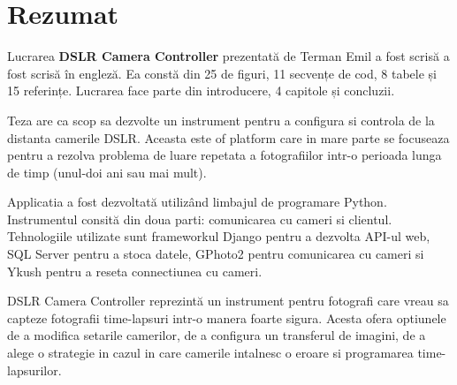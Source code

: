 \section*{Rezumat}

Lucrarea \textbf{DSLR Camera Controller} prezentată de Terman Emil a fost scrisă a fost scrisă în engleză. Ea constă din 25 de figuri, 11 secvențe de cod, 8 tabele și 15 referințe. Lucrarea face parte din introducere, 4 capitole și concluzii.

Teza are ca scop sa dezvolte un instrument pentru a configura si controla de la distanta camerile DSLR. Aceasta este of platform care in mare parte se focuseaza pentru a rezolva problema de luare repetata a fotografiilor intr-o perioada lunga de timp (unul-doi ani sau mai mult).

Applicatia a fost dezvoltată utilizând limbajul de programare Python. Instrumentul consită din doua parti: comunicarea cu cameri si clientul. Tehnologiile utilizate sunt frameworkul Django pentru a dezvolta API-ul web, SQL Server pentru a stoca datele, GPhoto2 pentru comunicarea cu cameri si Ykush pentru a reseta connectiunea cu cameri.

DSLR Camera Controller reprezintă un instrument pentru fotografi care vreau sa capteze fotografii time-lapsuri intr-o manera foarte sigura. Acesta ofera optiunele de a modifica setarile camerilor, de a configura un transferul de imagini, de a alege o strategie in cazul in care camerile intalnesc o eroare si programarea time-lapsurilor.